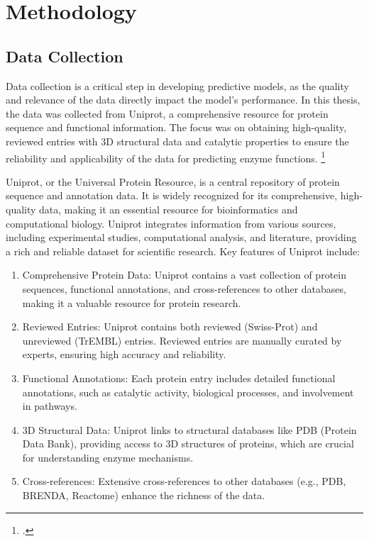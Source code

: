\section{Methodology}

\subsection{Data Collection}
\label{sec:Data Collection}

Data collection is a critical step in developing predictive models, as the quality and relevance of the data directly impact the model's performance. In this thesis, the data was collected from Uniprot, a comprehensive resource for protein sequence and functional information. The focus was on obtaining high-quality, reviewed entries with 3D structural data and catalytic properties to ensure the reliability and applicability of the data for predicting enzyme functions. \footcite{uniprotconsortiumUniProtUniversalProtein2021}

Uniprot, or the Universal Protein Resource, is a central repository of protein sequence and annotation data. It is widely recognized for its comprehensive, high-quality data, making it an essential resource for bioinformatics and computational biology. Uniprot integrates information from various sources, including experimental studies, computational analysis, and literature, providing a rich and reliable dataset for scientific research.
Key features of Uniprot include:

\begin{enumerate}
    \item Comprehensive Protein Data: Uniprot contains a vast collection of protein sequences, functional annotations, and cross-references to other databases, making it a valuable resource for protein research.
    \item Reviewed Entries: Uniprot contains both reviewed (Swiss-Prot) and unreviewed (TrEMBL) entries. Reviewed entries are manually curated by experts, ensuring high accuracy and reliability.
    \item Functional Annotations: Each protein entry includes detailed functional annotations, such as catalytic activity, biological processes, and involvement in pathways.
    \item 3D Structural Data: Uniprot links to structural databases like PDB (Protein Data Bank), providing access to 3D structures of proteins, which are crucial for understanding enzyme mechanisms.
    \item Cross-references: Extensive cross-references to other databases (e.g., PDB, BRENDA, Reactome) enhance the richness of the data.
\end{enumerate}

